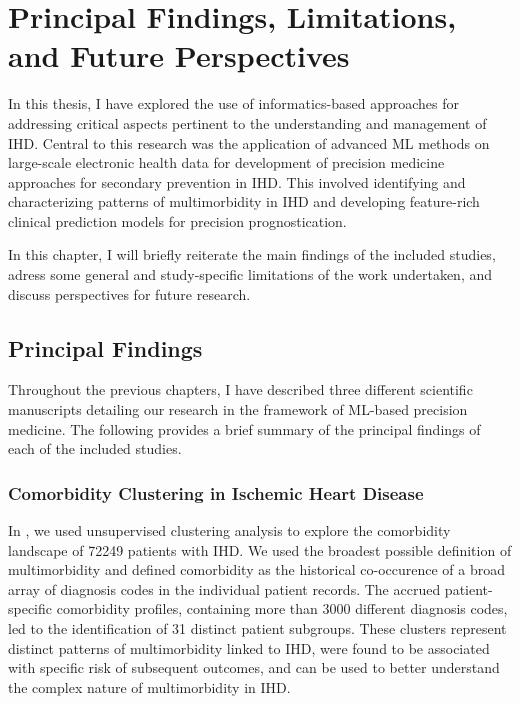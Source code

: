 \chapter{Principal Findings, Limitations, and Future Perspectives}
\label{chap:findings-and-limitations}

In this thesis, I have explored the use of informatics-based approaches 
for addressing critical aspects pertinent to the understanding and management 
of \ac{IHD}. 
Central to this research was the application of advanced \ac{ML} methods
on large-scale electronic health data for development of precision medicine
approaches for secondary prevention in \ac{IHD}.
This involved identifying and characterizing patterns of multimorbidity 
in \ac{IHD} and developing feature-rich clinical prediction models for 
precision prognostication.

In this chapter, I will briefly reiterate the main findings of the 
included studies, adress some general and study-specific limitations
of the work undertaken, and discuss perspectives for future research.

\section{Principal Findings}

Throughout the previous chapters, 
I have described three different scientific manuscripts
detailing our research in the framework of \ac{ML}-based precision medicine.
The following provides a brief summary of the principal findings 
of each of the included studies.

\subsection{Comorbidity Clustering in Ischemic Heart Disease}

In \studyi{}, 
we used unsupervised clustering analysis to explore the comorbidity landscape
of \num{72249} patients with \ac{IHD}. 
We used the broadest possible definition of multimorbidity and 
defined comorbidity as the historical co-occurence of a broad
array of diagnosis codes in the individual patient records.
The accrued patient-specific comorbidity profiles,
containing more than \num{3000} different diagnosis codes,
led to the identification of 31 distinct patient subgroups.
These clusters represent distinct patterns of multimorbidity 
linked to \ac{IHD}, were found to be associated with 
specific risk of subsequent outcomes,
and can be used to better understand the complex
nature of multimorbidity in \ac{IHD}.

